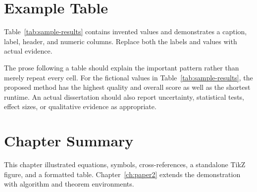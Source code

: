 \section{Example Table}

Table~\ref{tab:sample-results} contains invented values and demonstrates a caption, label, header, and numeric columns. Replace both the labels and values with actual evidence.

\begin{table}[ht]
\centering
\caption{Sample performance results using fictional data.}
\label{tab:sample-results}
\footnotesize
{}
\end{table}

The prose following a table should explain the important pattern rather than merely repeat every cell. For the fictional values in Table~\ref{tab:sample-results}, the proposed method has the highest quality and overall score as well as the shortest runtime. An actual dissertation should also report uncertainty, statistical tests, effect sizes, or qualitative evidence as appropriate.

\section{Chapter Summary}

This chapter illustrated equations, symbols, cross-references, a standalone TikZ figure, and a formatted table. Chapter~\ref{ch:paper2} extends the demonstration with algorithm and theorem environments.
